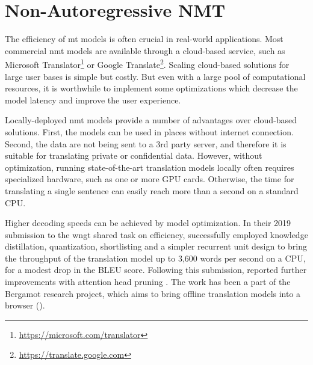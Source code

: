 \chapter{Non-Autoregressive NMT}
\label{chap:nat}

The efficiency of \gls{mt} models is often crucial in real-world applications.
Most commercial \gls{nmt} models are available through a cloud-based service,
such as Microsoft Translator\footnote{\url{https://microsoft.com/translator}}
or Google Translate\footnote{\url{https://translate.google.com}}. Scaling
cloud-based solutions for large user bases is simple but costly. But even with
a large pool of computational resources, it is worthwhile to implement some
optimizations which decrease the model latency and improve the user experience.


Locally-deployed \gls{nmt} models provide a number of advantages over
cloud-based solutions. First, the models can be used in places without internet
connection. Second, the data are not being sent to a 3rd party server, and
therefore it is suitable for translating private or confidential data.
However, without optimization, running state-of-the-art translation models
locally often requires specialized hardware, such as one or more GPU
cards. Otherwise, the time for translating a single sentence can easily reach
more than a second on a standard CPU.

Higher decoding speeds can be achieved by model optimization. In their 2019
submission to the \gls{wngt} shared task on efficiency,
\citet{kim-etal-2019-research} successfully employed knowledge distillation,
quantization, shortlisting \citep{jean2015using} and a simpler recurrent unit
design to bring the throughput of the translation model up to 3,600 words per
second on a CPU, for a modest drop in the BLEU score. Following this
submission, \citet{bogoychev-etal-2020-edinburghs} reported further
improvements with attention head pruning \citep{voita-etal-2019-analyzing}. The
work has been a part of the Bergamot research project, which aims to bring
offline translation models into a browser ().


